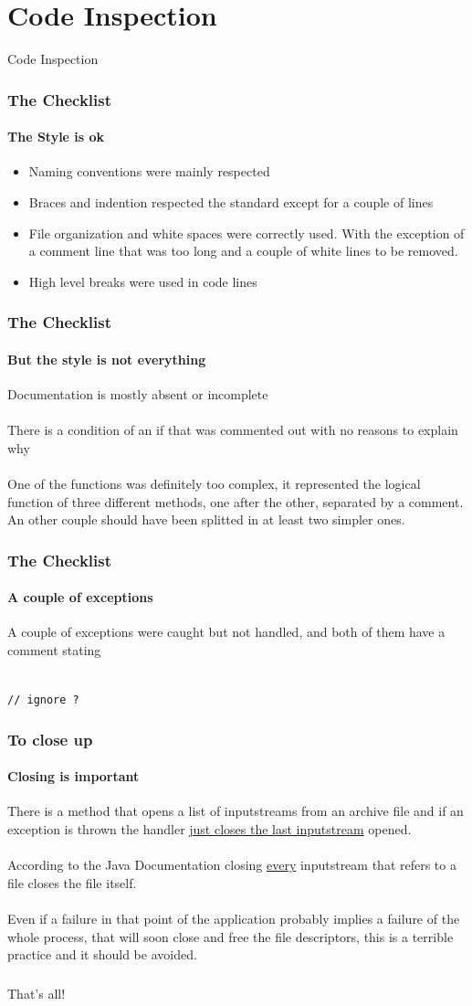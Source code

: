 \documentclass[10pt,xcolor={usenames,dvipsnames}]{beamer}
\begin{document}
\section[Section]{Code Inspection}
\begin{frame}
	\begin{center}
		Code Inspection
	\end{center}
\end{frame}
\begin{frame}
	\frametitle{The Checklist}
	\framesubtitle{The Style is ok}
	\begin{itemize}
		\item Naming conventions were mainly respected
		\item Braces and indention respected the standard except for a couple of lines
		\item File organization and white spaces were correctly used. With the exception of a comment line that was too long and a couple of white lines to be removed.
		\item High level breaks were used in code lines
	\end{itemize}
\end{frame}
\begin{frame}
	\frametitle{The Checklist}
	\framesubtitle{But the style is not everything}
	Documentation is mostly absent or incomplete\\
	\-\\
	There is a condition of an if that was commented out with no reasons to explain why\\
	\-\\
	One of the functions was definitely too complex, it represented the logical function of three different methods, one after the other, separated by a comment.\\
	An other couple should have been splitted in at least two simpler ones.
\end{frame}
\begin{frame}
	\frametitle{The Checklist}
	\framesubtitle{A couple of exceptions}
	A couple of exceptions were caught but not handled, and both of them have a comment stating\\
	\-\\
	{
		\begin{center}
			\color{Green}
			\texttt{// ignore ?}
		\end{center}
	}
\end{frame}
\begin{frame}
	\frametitle{To close up}
	\framesubtitle{Closing is important}
	There is a method that opens a list of inputstreams from an archive file and if an exception is thrown the handler \underline{just closes the last inputstream} opened.\\
	\-\\
	According to the Java Documentation closing \underline{every} inputstream that refers to a file closes the file itself.\\
	\-\\
	Even if a failure in that point of the application probably implies a failure of the whole process, that will soon close and free the file descriptors, this is a terrible practice and it should be avoided.
\end{frame}
\begin{frame}
	\frametitle{}
	\framesubtitle{}
	{
		\Huge
		\begin{center}
			That's all!
		\end{center}
	}
\end{frame}
\end{document}
